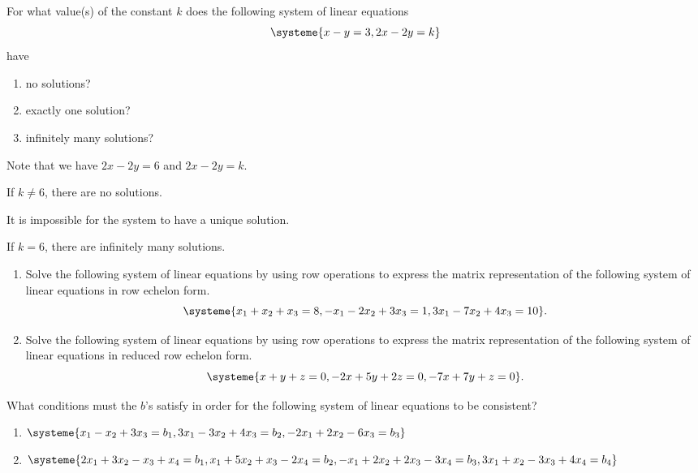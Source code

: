 \begin{problem}
    For what value(s) of the constant $k$ does the following system of linear equations \[\systeme{x - y = 3, 2x-2y =k}\] have
    \begin{enumerate}
        \item no solutions?
        \item exactly one solution?
        \item infinitely many solutions?
    \end{enumerate}
\end{problem}
\begin{solution}
    Note that we have $2x - 2y = 6$ and $2x - 2y = k$. 
    \begin{ppart}
        If $k \neq 6$, there are no solutions.
    \end{ppart}
    \begin{ppart}
        It is impossible for the system to have a unique solution.
    \end{ppart}
    \begin{ppart}
        If $k = 6$, there are infinitely many solutions.
    \end{ppart}
\end{solution}

\begin{problem}
    \begin{enumerate}
        \item Solve the following system of linear equations by using row operations to express the matrix representation of the following system of linear equations in row echelon form. \[\systeme{x_1 + x_2 + x_3 = 8, -x_1 - 2x_2 + 3x_3 = 1, 3x_1 - 7x_2 + 4x_3 = 10}.\]
        \item Solve the following system of linear equations by using row operations to express the matrix representation of the following system of linear equations in reduced row echelon form. \[\systeme{x + y + z = 0, -2x + 5y + 2z = 0, -7x+7y+z = 0}.\]
    \end{enumerate}
\end{problem}

\begin{problem}
    What conditions must the $b$'s satisfy in order for the following system of linear equations to be consistent?
    \begin{enumerate}
        \item $\systeme{x_1-x_2+3x_3=b_1,3x_1-3x_2+4x_3=b_2,-2x_1+2x_2-6x_3=b_3}$
        \item $\systeme{2x_1+3x_2-x_3+x_4=b_1,x_1+5x_2+x_3-2x_4=b_2,-x_1+2x_2+2x_3-3x_4=b_3,3x_1+x_2-3x_3+4x_4=b_4}$
    \end{enumerate}
\end{problem}

